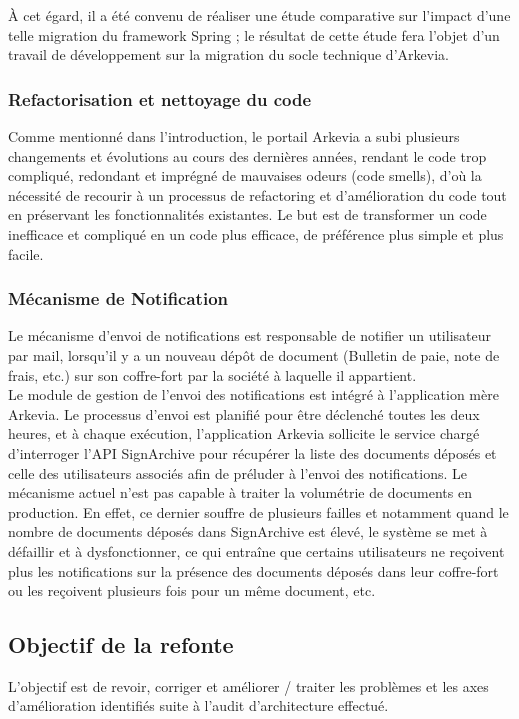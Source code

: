 À cet égard, il a été convenu de réaliser une étude comparative sur l'impact d'une telle migration du framework Spring ; le résultat de cette étude fera l'objet d'un travail de développement sur la migration du socle technique d'Arkevia.

\subsubsection{Refactorisation et nettoyage du code}
Comme mentionné dans l'introduction, le portail Arkevia a subi plusieurs changements et évolutions au cours des dernières années, rendant le code trop compliqué, redondant et imprégné de mauvaises odeurs (code smells), d'où la nécessité de recourir à un processus de refactoring et d'amélioration du code tout en préservant les fonctionnalités existantes. Le but est de transformer un code inefficace et compliqué en un code plus efficace, de préférence plus simple et plus facile.
\subsubsection{Mécanisme de Notification}
Le mécanisme d'envoi de notifications est responsable de notifier un utilisateur par mail, lorsqu'il y a un nouveau dépôt de document (Bulletin de paie, note de frais, etc.) sur son coffre-fort par la société à laquelle il appartient.\\

Le module de gestion de l'envoi des notifications est intégré à l'application mère Arkevia. Le processus d'envoi est planifié pour être déclenché toutes les deux heures, et à chaque exécution, l'application Arkevia sollicite le service chargé d'interroger l'API SignArchive pour récupérer la liste des documents déposés et celle des utilisateurs associés afin de préluder à l'envoi des notifications.
Le mécanisme actuel n'est pas capable à traiter la volumétrie de documents en production. En effet, ce dernier souffre de plusieurs failles et notamment quand le nombre de documents déposés dans SignArchive est élevé, le système se met à défaillir et à dysfonctionner, ce qui entraîne que certains utilisateurs ne reçoivent plus les notifications sur la présence des documents déposés dans leur coffre-fort ou les reçoivent plusieurs fois pour un même document, etc. 

\subsection{Objectif de la refonte}
L'objectif est de revoir, corriger et améliorer / traiter les problèmes et les axes d'amélioration identifiés suite à l'audit d'architecture effectué.

